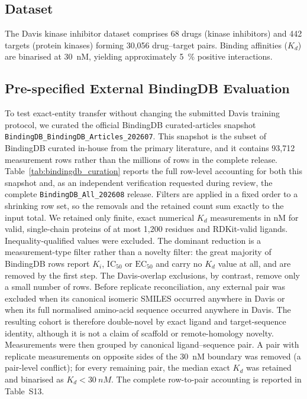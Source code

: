 \documentclass[fleqn,10pt]{wlscirep}
\begin{document}
\subsection{Dataset}

The Davis kinase inhibitor
dataset\cite{davis2011comprehensive} comprises 68 drugs (kinase inhibitors)
and 442 targets (protein kinases) forming 30{,}056 drug--target pairs.  Binding
affinities ($K_d$) are binarised at \SI{30}{nM}, yielding approximately
\SI{5}{\percent} positive interactions.

\subsection{Pre-specified External BindingDB Evaluation}
\label{sec:bindingdb_methods}

To test exact-entity transfer without changing the submitted Davis training
protocol, we curated the official BindingDB curated-articles snapshot
\texttt{BindingDB\_BindingDB\_Articles\_202607}.\cite{gilson2016bindingdb}
\begingroup\color{red}
This snapshot is the subset of BindingDB curated in-house from the primary
literature, and it contains 93{,}712 measurement rows rather than the millions
of rows in the complete release.  Table~\ref{tab:bindingdb_curation} reports the
full row-level accounting for both this snapshot and, as an independent
verification requested during review, the complete
\texttt{BindingDB\_All\_202608} release.  Filters are applied in a fixed order
to a shrinking row set, so the removals and the retained count sum exactly to
the input total.
\endgroup
We retained only finite, exact numerical $K_d$ measurements in nM for valid,
single-chain proteins of at most 1{,}200 residues and RDKit-valid ligands.
Inequality-qualified values were excluded.
\begingroup\color{red}
The dominant reduction is a measurement-type filter rather than a novelty
filter: the great majority of BindingDB rows report $K_i$, $\mathrm{IC}_{50}$ or
$\mathrm{EC}_{50}$ and carry no $K_d$ value at all, and are removed by the first
step.  The Davis-overlap exclusions, by contrast, remove only a small number of
rows.
\endgroup
Before replicate reconciliation, any
external pair was excluded when its canonical isomeric
SMILES occurred anywhere in Davis or when its full normalised amino-acid
sequence occurred anywhere in Davis.  The resulting cohort is therefore
double-novel by exact ligand and target-sequence identity, although it is not a
claim of scaffold or remote-homology novelty. Measurements were then grouped by
canonical ligand--sequence pair. A pair with replicate measurements on opposite
sides of the \SI{30}{nM} boundary was removed (a pair-level conflict); for every
remaining pair, the median exact $K_d$ was retained and binarised as
$K_d<\SI{30}{nM}$. The complete row-to-pair accounting is reported in
Table~S13.
\end{document}
